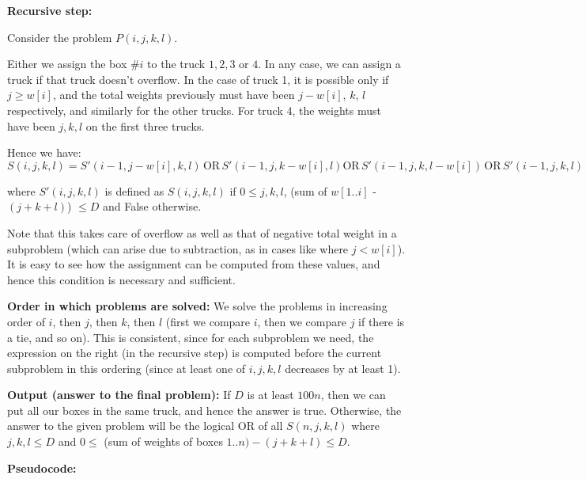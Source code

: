 \documentclass[answers]{exam}
\begin{document}
\begin{questions}
\begin{solution}
        \textbf{Recursive step:}

Consider the problem $P(i, j, k, l)$.

Either we assign the box $\#i$ to the truck $1, 2, 3$ or $4$. In any case, we can assign a truck if that truck doesn't overflow. In the case of truck 1, it is possible only if $j \ge w[i]$, and the
        total weights previously must have been $j - w[i]$, $k$, $l$ respectively, and similarly for the other trucks. For truck $4$, the weights must have been $j, k, l$ on the first three trucks.

Hence we have:
$$S(i, j, k, l) = S'(i-1, j - w[i], k, l) \, \text{OR} \, S'(i-1, j, k - w[i], l) \text{OR} \, S'(i-1, j, k, l - w[i]) \, \text{OR} \, S'(i-1, j, k, l)$$

where $S'(i, j, k, l)$ is defined as $S(i, j, k, l)$ if $0 \le j, k, l$, (sum of $w[1..i]$ - $(j + k + l)$) $\le D$ and False otherwise.

Note that this takes care of overflow as well as that of negative total weight in a subproblem (which can arise due to subtraction, as in cases like where $j < w[i]$).
It is easy to see how the assignment can be computed from these values, and hence this condition is necessary and sufficient.

        \textbf{Order in which problems are solved:}
We solve the problems in increasing order of $i$, then $j$, then $k$, then $l$ (first we compare $i$, then we compare $j$ if there is a tie, and so on). This is consistent, since for each subproblem
        we need, the expression on the right (in the recursive step) is computed before the current subproblem in this ordering (since at least one of $i, j, k, l$ decreases by at least 1).

        \textbf{Output (answer to the final problem):}
If $D$ is at least $100n$, then we can put all our boxes in the same truck, and hence the answer is true. Otherwise, the answer to the given problem will be the logical OR of all $S(n, j, k, l)$ where
        $j, k, l \le D$ and $0 \le$ (sum of weights of boxes $1..n) - (j + k + l) \le D$.

        \textbf{Pseudocode:}


\end{solution}
\end{questions}
\end{document}

